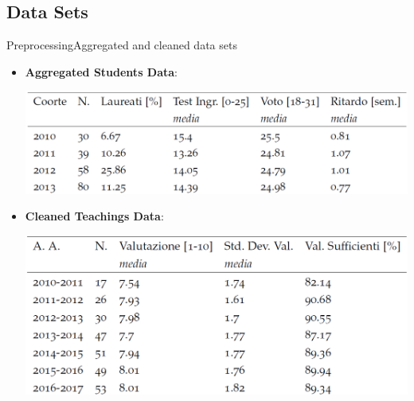 \subsection{Data Sets}
\begin{frame}{Preprocessing}{Aggregated and cleaned data sets}

\begin{itemize}
    \item<1->\textbf{Aggregated Students Data}:\\
        \noindent\begin{centering}
            \hspace*{1.0cm}\includegraphics[scale=0.175]{img7.png}
        \end{centering}
    \vspace{0.2cm}
    \item<2->\textbf{Cleaned Teachings Data}:\\
        \noindent\begin{centering}
            \hspace*{1.0cm}\includegraphics[scale=0.175]{img6.png}
        \end{centering}
\end{itemize}

\end{frame}